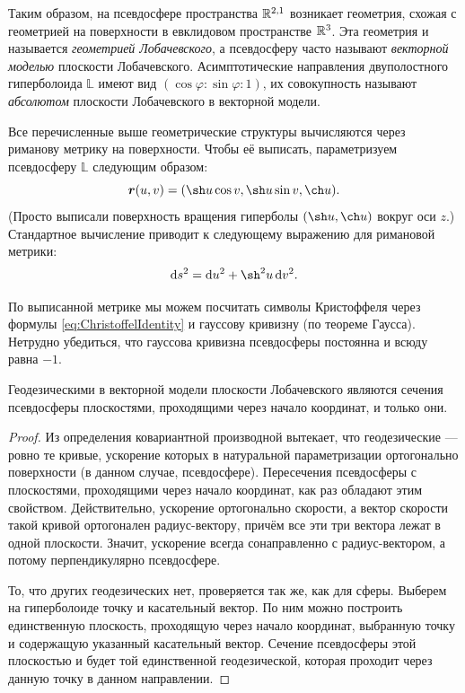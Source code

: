 Таким образом, на псевдосфере пространства $\mathbb{R}^{2, 1}$ возникает геометрия, схожая с геометрией на поверхности в евклидовом пространстве $\mathbb{R}^3$. Эта геометрия и называется \textit{геометрией Лобачевского}, а псевдосферу часто называют \textit{векторной моделью} плоскости Лобачевского. Асимптотические направления двуполостного гиперболоида $\mathbb{L}$ имеют вид $(\cos\varphi : \sin\varphi : 1)$, их совокупность называют \textit{абсолютом} плоскости Лобачевского в векторной модели.

Все перечисленные выше геометрические структуры вычисляются через риманову метрику на поверхности. Чтобы её выписать, параметризуем псевдосферу $\mathbb{L}$ следующим образом:
\[
	\vec{r}(u, v) = (\sh u\cos v, \sh u\sin v, \ch u).
\]
(Просто выписали поверхность вращения гиперболы $(\sh u, \ch u)$ вокруг оси $z$.) Стандартное вычисление приводит к следующему выражению для римановой метрики:
\[
	\d s^2 = \d u^2 + \sh^2u\d v^2.
\]

По выписанной метрике мы можем посчитать символы Кристоффеля через формулы \eqref{eq:ChristoffelIdentity} и гауссову кривизну (по теореме Гаусса). Нетрудно убедиться, что гауссова кривизна псевдосферы постоянна и всюду равна $-1$.

\begin{theorem}
	Геодезическими в векторной модели плоскости Лобачевского являются сечения псевдосферы плоскостями, проходящими через начало координат, и только они.
\end{theorem}

\begin{proof}
	Из определения ковариантной производной вытекает, что геодезические --- ровно те кривые, ускорение которых в натуральной параметризации ортогонально поверхности (в данном случае, псевдосфере). Пересечения псевдосферы с плоскостями, проходящими через начало координат, как раз обладают этим свойством. Действительно, ускорение ортогонально скорости, а вектор скорости такой кривой ортогонален радиус-вектору, причём все эти три вектора лежат в одной плоскости. Значит, ускорение всегда сонаправленно с радиус-вектором, а потому перпендикулярно псевдосфере.

	То, что других геодезических нет, проверяется так же, как для сферы. Выберем на гиперболоиде точку и касательный вектор. По ним можно построить единственную плоскость, проходящую через начало координат, выбранную точку и содержащую указанный касательный вектор. Сечение псевдосферы этой плоскостью и будет той единственной геодезической, которая проходит через данную точку в данном направлении.
\end{proof}

